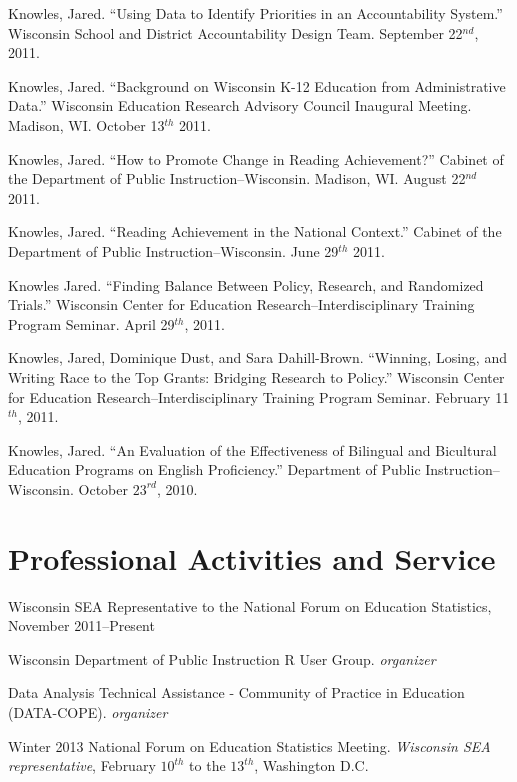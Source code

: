 \documentclass[margin,line]{res}
\begin{document}
\begin{resume}
Knowles, Jared. ``Using Data to Identify Priorities in an Accountability System.'' Wisconsin School and District Accountability Design Team. September 22$^{nd}$, 2011.

Knowles, Jared. ``Background on Wisconsin K-12 Education from Administrative Data.'' Wisconsin Education Research Advisory Council Inaugural Meeting. Madison, WI. October 13$^{th}$ 2011.

Knowles, Jared. ``How to Promote Change in Reading Achievement?'' Cabinet of the Department of Public Instruction--Wisconsin. Madison, WI. August 22$^{nd}$ 2011.

Knowles, Jared. ``Reading Achievement in the National Context.'' Cabinet of the Department of Public Instruction--Wisconsin. June 29$^{th}$ 2011.

Knowles Jared. ``Finding Balance Between Policy, Research, and Randomized Trials.'' Wisconsin Center for Education Research--Interdisciplinary Training Program Seminar. April 29$^{th}$, 2011.

Knowles, Jared, Dominique Dust, and Sara Dahill-Brown. ``Winning, Losing, and Writing Race to the Top Grants: Bridging Research to Policy.'' Wisconsin Center for Education Research--Interdisciplinary Training Program Seminar. February 11$^{th}$, 2011.

Knowles, Jared. ``An Evaluation of the Effectiveness of Bilingual and Bicultural Education Programs on English Proficiency.'' Department of Public Instruction--Wisconsin. October $23^{rd}$, 2010. 


\section{\sc Professional Activities and Service}

Wisconsin SEA Representative to the National Forum on Education Statistics, November 2011--Present

Wisconsin Department of Public Instruction R User Group. \emph{organizer}

Data Analysis Technical Assistance - Community of Practice in Education (DATA-COPE). \emph{organizer} 


Winter 2013 National Forum on Education Statistics Meeting. \emph{Wisconsin SEA representative}, February $10^{th}$ to the $13^{th}$, Washington D.C.


\end{resume}
\end{document}
